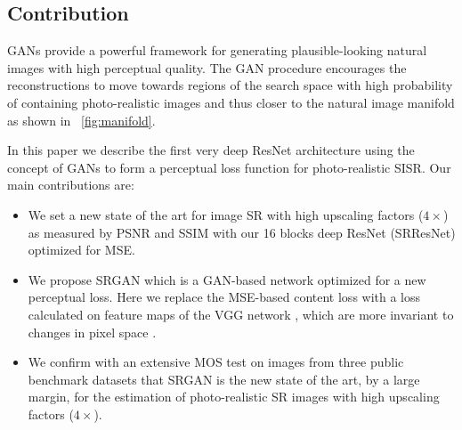 \documentclass[10pt,twocolumn,letterpaper]{article}
\begin{document}
\subsection{Contribution}
\acp{GAN} provide a powerful framework for generating plausible-looking natural images with high perceptual quality.
The \ac{GAN} procedure encourages the reconstructions to move towards regions of the search space with high probability of containing photo-realistic images and thus closer to the natural image manifold as shown in \figurename~\ref{fig:manifold}.

In this paper we describe the first very deep \ac{ResNet} \cite{he2015deep,he2016identity} architecture using the concept of \acp{GAN} to form a perceptual loss function for photo-realistic \ac{SISR}. Our main contributions are:
\begin{itemize}
\item We set a new state of the art for image \ac{SR} with high upscaling factors ($4\times$) as measured by \ac{PSNR} and \ac{SSIM} with our 16 blocks deep \ac{ResNet} (SRResNet) optimized for \ac{MSE}. %
\item We propose SRGAN which is a \ac{GAN}-based network optimized for a new perceptual loss. Here we replace the \ac{MSE}-based content loss with a loss calculated on feature maps of the VGG network \cite{simonyan2014very}, which are more invariant to changes in pixel space \cite{Li2016}. %
\item We confirm with an extensive \ac{MOS} test on images from three public benchmark datasets that SRGAN is the new state of the art, by a large margin, for the estimation of photo-realistic \ac{SR} images with high upscaling factors ($4\times$).
\end{itemize}
\end{document}
